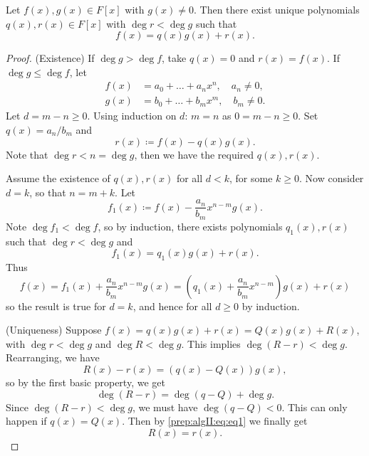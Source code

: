 \documentclass[10pt, a4paper]{article}
\begin{document}
\begin{proposition}\label{prep:algII:prop:divalgpoly}
    Let $f(x), g(x) \in F[x]$ with $g(x) \neq 0$.
    Then there exist unique polynomials $q(x), r(x) \in F[x]$ with $\deg{r} < \deg{g}$ such that
    \[
    f(x) = q(x)g(x) + r(x).
    \]

    \begin{proof}
        (Existence)
        If $\deg{g} > \deg{f}$,
        take $q(x) = 0$ and $r(x) = f(x)$.
        If $\deg{g} \leq \deg{f}$,
        let
        \begin{align*}
            f(x) &= a_0 + \dotsc + a_nx ^ n,\quad a_n \neq 0, \\
            g(x) &= b_0 + \dotsc + b_mx ^ m,\quad b_m \neq 0.
        \end{align*}
        Let $d = m - n \geq 0$.
        Using induction on $d$:
        $m = n$ as $0 = m - n \geq 0$.
        Set $q(x) = a_n / b_m$ and
        \[
        r(x) \coloneqq f(x) - q(x)g(x).
        \]
        Note that $\deg{r} < n = \deg{g}$,
        then we have the required $q(x), r(x)$.

        Assume the existence of $q(x), r(x)$ for all $d < k$,
        for some $k \geq 0$.
        Now consider $d = k$,
        so that $n = m + k$.
        Let
        \[
        f_1(x) \coloneqq f(x) - \frac{a_n}{b_m}x ^ {n - m}g(x).
        \]
        Note $\deg{f_1} < \deg{f}$,
        so by induction,
        there exists polynomials $q_1(x), r(x)$ such that $\deg{r} < \deg{g}$ and
        \[
        f_1(x) = q_1(x)g(x) + r(x).
        \]
        Thus
        \[
        f(x) = f_1(x) + \frac{a_n}{b_m}x ^ {n - m}g(x) = (q_1(x) + \frac{a_n}{b_m}x ^ {n - m})g(x) + r(x)
        \]
        so the result is true for $d = k$,
        and hence for all $d \geq 0$ by induction.

        (Uniqueness)
        Suppose $f(x) = q(x)g(x) + r(x) = Q(x)g(x) + R(x)$,
        with $\deg{r} < \deg{g}$ and $\deg{R} < \deg{g}$.
        This implies $\deg(R - r) < \deg{g}$.
        Rearranging,
        we have
        \begin{equation}\label{prep:algII:eq:eq1}\tag{*}
            R(x) - r(x) = (q(x) - Q(x))g(x),
        \end{equation}
        so by the first basic property,
        we get
        \[
        \deg(R - r) = \deg(q - Q) + \deg{g}.
        \]
        Since $\deg(R - r) < \deg{g}$,
        we must have $\deg(q - Q) < 0$.
        This can only happen if $q(x) = Q(x)$.
        Then by \eqref{prep:algII:eq:eq1} we finally get
        \[
        R(x) = r(x).
        \]
    \end{proof}
\end{proposition}
\end{document}
